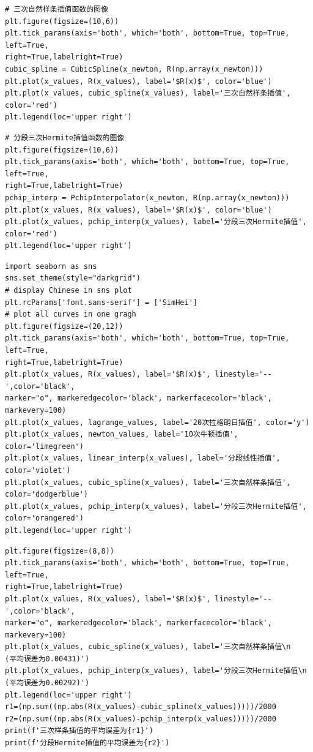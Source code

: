 \documentclass[UTF8,ctexart,a4paper,11pt,openany]{article}
\theoremstyle{definition}
\begin{document}
\begin{lstlisting}[aboveskip=0pt]
# 三次自然样条插值函数的图像
plt.figure(figsize=(10,6))
plt.tick_params(axis='both', which='both', bottom=True, top=True, left=True, 
right=True,labelright=True)
cubic_spline = CubicSpline(x_newton, R(np.array(x_newton)))
plt.plot(x_values, R(x_values), label='$R(x)$', color='blue')
plt.plot(x_values, cubic_spline(x_values), label='三次自然样条插值', color='red')
plt.legend(loc='upper right')
\end{lstlisting}
\begin{lstlisting}[aboveskip=0pt]
# 分段三次Hermite插值函数的图像
plt.figure(figsize=(10,6))
plt.tick_params(axis='both', which='both', bottom=True, top=True, left=True, 
right=True,labelright=True)
pchip_interp = PchipInterpolator(x_newton, R(np.array(x_newton)))
plt.plot(x_values, R(x_values), label='$R(x)$', color='blue')
plt.plot(x_values, pchip_interp(x_values), label='分段三次Hermite插值', color='red')
plt.legend(loc='upper right')
\end{lstlisting}
\begin{lstlisting}[aboveskip=0pt]
import seaborn as sns
sns.set_theme(style="darkgrid")
# display Chinese in sns plot
plt.rcParams['font.sans-serif'] = ['SimHei']
# plot all curves in one gragh
plt.figure(figsize=(20,12))
plt.tick_params(axis='both', which='both', bottom=True, top=True, left=True, 
right=True,labelright=True)
plt.plot(x_values, R(x_values), label='$R(x)$', linestyle='--',color='black',
marker="o", markeredgecolor='black', markerfacecolor='black', markevery=100)
plt.plot(x_values, lagrange_values, label='20次拉格朗日插值', color='y')
plt.plot(x_values, newton_values, label='10次牛顿插值', color='limegreen')
plt.plot(x_values, linear_interp(x_values), label='分段线性插值', 
color='violet')
plt.plot(x_values, cubic_spline(x_values), label='三次自然样条插值', 
color='dodgerblue')
plt.plot(x_values, pchip_interp(x_values), label='分段三次Hermite插值', 
color='orangered')
plt.legend(loc='upper right')
\end{lstlisting}
\begin{lstlisting}[aboveskip=0pt]
plt.figure(figsize=(8,8))
plt.tick_params(axis='both', which='both', bottom=True, top=True, left=True, 
right=True,labelright=True)
plt.plot(x_values, R(x_values), label='$R(x)$', linestyle='--',color='black',
marker="o", markeredgecolor='black', markerfacecolor='black', markevery=100)
plt.plot(x_values, cubic_spline(x_values), label='三次自然样条插值\n
(平均误差为0.00431)')
plt.plot(x_values, pchip_interp(x_values), label='分段三次Hermite插值\n
(平均误差为0.00292)')
plt.legend(loc='upper right')
r1=(np.sum((np.abs(R(x_values)-cubic_spline(x_values)))))/2000
r2=(np.sum((np.abs(R(x_values)-pchip_interp(x_values)))))/2000
print(f'三次样条插值的平均误差为{r1}')
print(f'分段Hermite插值的平均误差为{r2}')
\end{lstlisting}
\clearpage


\clearpage



\end{document}
